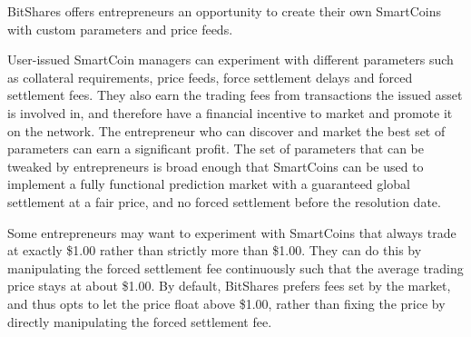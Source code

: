 BitShares offers entrepreneurs an opportunity to create their own SmartCoins
with custom parameters and price feeds.

User-issued SmartCoin managers can experiment with different parameters such as
collateral requirements, price feeds, force settlement delays and forced
settlement fees. They also earn the trading fees from transactions the issued
asset is involved in, and therefore have a financial incentive to market and
promote it on the network. The entrepreneur who can discover and market the
best set of parameters can earn a significant profit. The set of parameters
that can be tweaked by entrepreneurs is broad enough that SmartCoins can be
used to implement a fully functional prediction market with a guaranteed global
settlement at a fair price, and no forced settlement before the resolution
date.

Some entrepreneurs may want to experiment with SmartCoins that always trade at
exactly \$1.00 rather than strictly more than \$1.00. They can do this by
manipulating the forced settlement fee continuously such that the average
trading price stays at about \$1.00. By default, BitShares prefers fees set by
the market, and thus opts to let the price float above \$1.00, rather than
fixing the price by directly manipulating the forced settlement fee.
